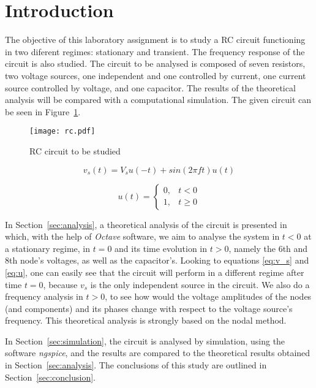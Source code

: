 \section{Introduction}
\label{sec:introduction}

\par The objective of this laboratory assignment is to study a RC circuit functioning in two diferent regimes: stationary and transient. The frequency response of the circuit is also studied. The circuit to be analysed is composed of seven resistors, two voltage sources, one independent and one controlled by current, one current source controlled by voltage, and one capacitor. The results of the theoretical analysis will be compared with a computational simulation. The given circuit can be seen in Figure~\ref{fig:circuit}.

\begin{figure}[H]
\centering
\texttt{[image: rc.pdf]}
\caption{RC circuit to be studied}
\label{fig:circuit}
\end{figure}

\begin{multicols}{2}
\begin{equation}
    v_s(t) = V_s u(-t) + sin(2 \pi ft) u(t)
    \label{eq:v_s}
\end{equation}

\begin{equation}
    u(t) = \left \{ \begin{matrix} 0, & t<0 \\ 1, & t\geqslant 0 \end{matrix} \right.
    \label{eq:u}
\end{equation}
\end{multicols}

\par In Section~\ref{sec:analysis}, a theoretical analysis of the circuit is presented in which, with the help of \textit{Octave} software, we aim to analyse the system  in $t<0$ at a stationary regime, in $t=0$ and its time evolution in $t>0$, namely the 6th and 8th node's voltages, as well as the capacitor's.
Looking to equations \ref{eq:v_s} and \ref{eq:u}, one can easily see that the circuit will perform in a different regime after time $t=0$, because $v_s$ is the only independent source in the circuit. We also do a frequency analysis in $t>0$, to see how would the voltage amplitudes of the nodes (and components) and its phases change
with respect to the voltage source's frequency. This theoretical analysis is strongly based on the nodal method.

\par In Section~\ref{sec:simulation}, the circuit is analysed by
simulation, using the software \textit{ngspice}, and the results are compared to the theoretical results obtained in
Section~\ref{sec:analysis}. The conclusions of this study are outlined in Section~\ref{sec:conclusion}.
